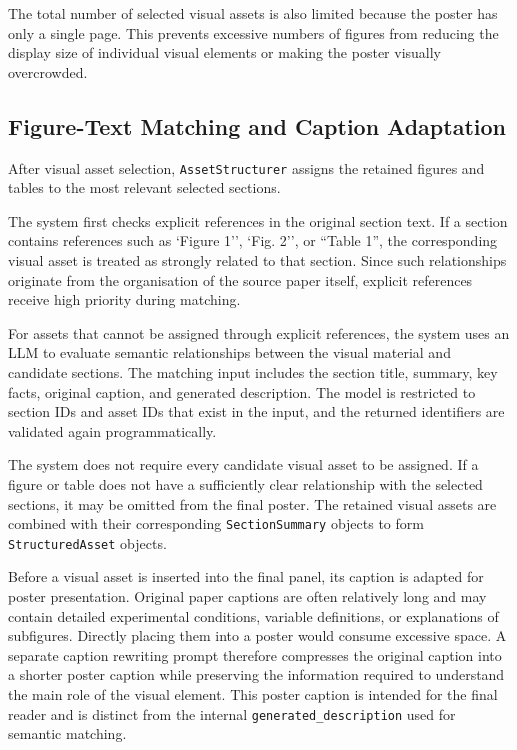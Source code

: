 \documentclass[12pt,oneside]{report}
\begin{document}
The total number of selected visual assets is also limited because the poster has only a single page. This prevents excessive numbers of figures from reducing the display size of individual visual elements or making the poster visually overcrowded.

\subsection{Figure-Text Matching and Caption Adaptation}

After visual asset selection, \texttt{AssetStructurer} assigns the retained figures and tables to the most relevant selected sections.

\vspace{1em}

The system first checks explicit references in the original section text. If a section contains references such as `Figure 1'', `Fig. 2'', or ``Table 1'', the corresponding visual asset is treated as strongly related to that section. Since such relationships originate from the organisation of the source paper itself, explicit references receive high priority during matching.

\vspace{1em}

For assets that cannot be assigned through explicit references, the system uses an LLM to evaluate semantic relationships between the visual material and candidate sections. The matching input includes the section title, summary, key facts, original caption, and generated description. The model is restricted to section IDs and asset IDs that exist in the input, and the returned identifiers are validated again programmatically.

\vspace{1em}

The system does not require every candidate visual asset to be assigned. If a figure or table does not have a sufficiently clear relationship with the selected sections, it may be omitted from the final poster. The retained visual assets are combined with their corresponding \texttt{SectionSummary} objects to form \texttt{StructuredAsset} objects.

\vspace{1em}

Before a visual asset is inserted into the final panel, its caption is adapted for poster presentation. Original paper captions are often relatively long and may contain detailed experimental conditions, variable definitions, or explanations of subfigures. Directly placing them into a poster would consume excessive space. A separate caption rewriting prompt therefore compresses the original caption into a shorter poster caption while preserving the information required to understand the main role of the visual element. This poster caption is intended for the final reader and is distinct from the internal \texttt{generated\_description} used for semantic matching.
\end{document}
